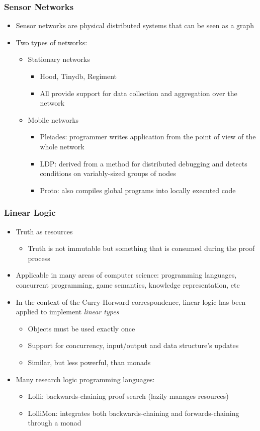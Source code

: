 \documentclass{beamer}
\begin{document}
\frame
{
   \frametitle{Sensor Networks}
   \begin{itemize}
      \item Sensor networks are physical distributed systems that can be seen as a graph
      \item Two types of networks:
      \begin{itemize}
         \item Stationary networks
         \begin{itemize}
            \item Hood, Tinydb, Regiment
            \item All provide support for data collection and aggregation over the network
         \end{itemize}
         \item Mobile networks
         \begin{itemize}
            \item Pleiades: programmer writes application from the point of view of the whole network
            \item LDP: derived from a method for distributed debugging and detects conditions on variably-sized groups of nodes
            \item Proto: also compiles global programs into locally executed code
         \end{itemize}
      \end{itemize}
   \end{itemize}
}

\frame
{
   \frametitle{Linear Logic}
   \begin{itemize}
      \item Truth as resources
      \begin{itemize}
         \item Truth is not immutable but something that is consumed during the proof process
      \end{itemize}
      \item Applicable in many areas of computer science: programming languages, concurrent programming, game semantics, knowledge representation, etc
      \item In the context of the Curry-Horward correspondence, linear logic has been applied to implement \emph{linear types}
      \begin{itemize}
         \item Objects must be used exactly once
         \item Support for concurrency, input/output and data structure's updates
         \item Similar, but less powerful, than monads
      \end{itemize}
      \item Many research logic programming languages:
      \begin{itemize}
         \item Lolli: backwards-chaining proof search (lazily manages resources)
         \item LolliMon: integrates both backwards-chaining and forwards-chaining through a monad
      \end{itemize}
   \end{itemize}
}
\end{document}
